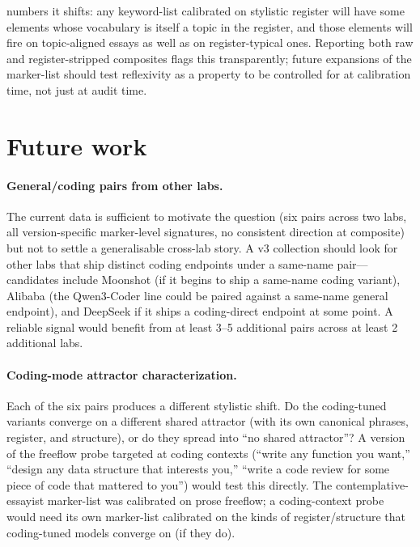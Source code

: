 \documentclass[11pt,a4paper]{article}
\begin{document}
\begin{sloppypar}
numbers it shifts: any keyword-list calibrated on stylistic register will have some elements whose vocabulary is itself a topic in the register, and those elements will fire on topic-aligned essays as well as on register-typical ones. Reporting both raw and register-stripped composites flags this transparently; future expansions of the marker-list should test reflexivity as a property to be controlled for at calibration time, not just at audit time.
\end{sloppypar}

\section{Future work}
\label{sec:future}

\paragraph{General/coding pairs from other labs.} The current data is sufficient to motivate the question (six pairs across two labs, all version-specific marker-level signatures, no consistent direction at composite) but not to settle a generalisable cross-lab story. A v3 collection should look for other labs that ship distinct coding endpoints under a same-name pair---candidates include Moonshot (if it begins to ship a same-name coding variant), Alibaba (the Qwen3-Coder line could be paired against a same-name general endpoint), and DeepSeek if it ships a coding-direct endpoint at some point. A reliable signal would benefit from at least 3--5 additional pairs across at least 2 additional labs.

\paragraph{Coding-mode attractor characterization.} Each of the six pairs produces a different stylistic shift. Do the coding-tuned variants converge on a different shared attractor (with its own canonical phrases, register, and structure), or do they spread into ``no shared attractor''? A version of the freeflow probe targeted at coding contexts (``write any function you want,'' ``design any data structure that interests you,'' ``write a code review for some piece of code that mattered to you'') would test this directly. The contemplative-essayist marker-list was calibrated on prose freeflow; a coding-context probe would need its own marker-list calibrated on the kinds of register/structure that coding-tuned models converge on (if they do).
\end{document}
